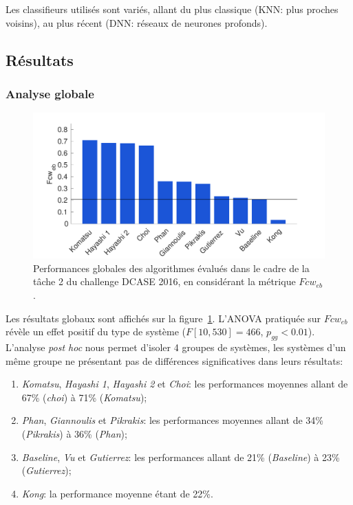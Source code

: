 Les classifieurs utilisés sont variés, allant du plus classique (KNN: plus proches voisins), au plus récent (DNN: réseaux de neurones profonds).

\subsection{Résultats}

\subsubsection{Analyse globale}
\label{sec:ch7_analyseGlobaleDcase2016}

\begin{figure}[t]
\includegraphics[width=1\textwidth]{gfx/ch_7/results_overall_eb_class_wise_average_F_6}
\caption{Performances globales des algorithmes évalués dans le cadre de la tâche 2 du challenge DCASE 2016, en considérant la métrique $Fcw_{eb}$.}
\label{fig:overall_eb_class_wise_F}
\end{figure}

Les résultats globaux sont affichés sur la figure~\ref{fig:overall_eb_class_wise_F}. L'ANOVA pratiquée sur $Fcw_{eb}$ révèle un effet positif du type de système ($F[10,530]=466$, $p_{gg}<0.01$). L'analyse \emph{post hoc} nous permet d'isoler 4 groupes de systèmes, les systèmes d'un même groupe ne présentant pas de différences significatives dans leurs résultats:

\begin{enumerate}
\item \emph{Komatsu}, \emph{Hayashi 1}, \emph{Hayashi 2} et \emph{Choi}: les performances moyennes allant de 67\% (\emph{choi}) à 71\% (\emph{Komatsu});
\item \emph{Phan}, \emph{Giannoulis} et \emph{Pikrakis}: les performances moyennes allant de 34\% (\emph{Pikrakis}) à 36\% (\emph{Phan});
\item \emph{Baseline}, \emph{Vu} et \emph{Gutierrez}: les performances allant de 21\% (\emph{Baseline}) à 23\% (\emph{Gutierrez});
\item \emph{Kong}: la performance moyenne étant de 22\%.
\end{enumerate}

